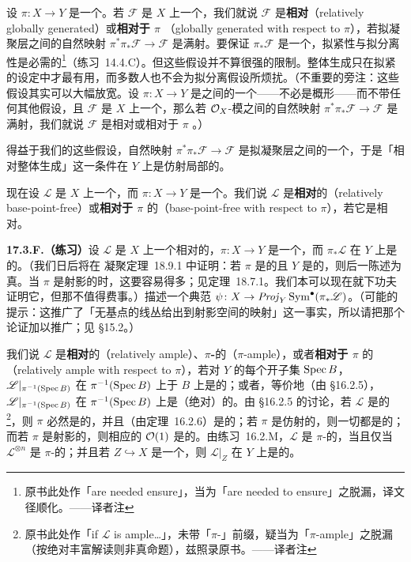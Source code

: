 设 $\pi\colon X\to Y$ 是一个\trQuasicompact\trQuasiSeparated\trMorphism。若 $\mathscr{F}$ 是 $X$ 上一个\trQCSheaf，我们就说 $\mathscr{F}$ 是\textbf{相对\trGloballyGenerated}（relatively globally generated）或\textbf{相对于 $\pi$ \trGloballyGenerated}（globally generated with respect to $\pi$），若拟凝聚层之间的自然映射 $\pi^*\pi_*\mathscr{F}\to\mathscr{F}$ 是满射。要保证 $\pi_*\mathscr{F}$ 是一个\trQCSheaf，拟紧性与拟分离性是必需的\footnote{原书此处作「are needed ensure」，当为「are needed to ensure」之脱漏，译文径顺化。——译者注}（\mbox{练习~14.4.C}）。但这些假设并不算很强的限制。整体生成只在拟紧的设定中才最有用，而多数人也不会为拟分离假设所烦扰。（不重要的旁注：这些假设其实可以大幅放宽。设 $\pi\colon X\to Y$ 是\emph{\trLocallyRingedSpace}之间的一个\trMorphism——不必是概形——而不带任何其他假设，且 $\mathscr{F}$ 是 $X$ 上一个\trQCSheaf，那么若 $\mathcal{O}_X$-模之间的自然映射 $\pi^*\pi_*\mathscr{F}\to\mathscr{F}$ 是满射，我们就说 $\mathscr{F}$ 是相对\trGloballyGenerated{}或相对于 $\pi$ \trGloballyGenerated。）

得益于我们的这些假设，自然映射 $\pi^*\pi_*\mathscr{F}\to\mathscr{F}$ 是拟凝聚层之间的一个\trMorphism，于是「相对整体生成」这一条件在 $Y$ 上是仿射局部的。

现在设 $\mathscr{L}$ 是 $X$ 上一个\trLocallyFreeSheaf，而 $\pi\colon X\to Y$ 是一个\trMorphism。我们说 $\mathscr{L}$ 是\textbf{相对\trBasePointFree}的（relatively base-point-free）或\textbf{相对于 $\pi$ \trBasePointFree}的（base-point-free with respect to $\pi$），若它是相对\trGloballyGenerated。

\textbf{17.3.F.（练习）}\quad 设 $\mathscr{L}$ 是 $X$ 上一个相对\trBasePointFree{}的\trLineBundle，$\pi\colon X\to Y$ 是一个\trQuasicompact\trSeparated\trMorphism，而 $\pi_*\mathscr{L}$ 在 $Y$ 上是\trFiniteType{}的。（我们日后将在 \trGrothendieck{}凝聚定理~18.9.1 中证明：若 $\pi$ 是\trProper{}的且 $Y$ 是\trNoetherian{}的，则后一陈述为真。当 $\pi$ 是射影的时，这要容易得多；见\mbox{定理~18.7.1}。我们本可以现在就下功夫证明它，但那不值得费事。）描述一个典范\trMorphism{} $\psi\colon X\to\mathit{Proj}_Y\operatorname{Sym}^\bullet(\pi_*\mathscr{L})$。（可能的提示：这推广了「无基点的线丛给出到射影空间的映射」这一事实，所以请把那个论证加以推广；见 \S15.2。）

我们说 $\mathscr{L}$ 是\textbf{相对\trAmple}的（relatively ample）、\textbf{$\pi$-\trAmple}的（$\pi$-ample），或者\textbf{相对于 $\pi$ \trAmple}的（relatively ample with respect to $\pi$），若对 $Y$ 的每个\trAffine{}开子集 $\operatorname{Spec} B$，$\mathscr{L}|_{\pi^{-1}(\operatorname{Spec} B)}$ 在 $\pi^{-1}(\operatorname{Spec} B)$ 上于 $B$ 上是\trAmple{}的；或者，等价地（由 \S16.2.5），$\mathscr{L}|_{\pi^{-1}(\operatorname{Spec} B)}$ 在 $\pi^{-1}(\operatorname{Spec} B)$ 上是（绝对）\trAmple{}的。由 \S16.2.5 的讨论，若 $\mathscr{L}$ 是\trAmple{}的\footnote{原书此处作「if $\mathscr{L}$ is ample…」，未带「$\pi$-」前缀，疑当为「$\pi$-ample」之脱漏（按绝对丰富解读则非真命题），兹照录原书。——译者注}，则 $\pi$ 必然是\trQuasicompact{}的，并且（由\mbox{定理~16.2.6}）是\trSeparated{}的；若 $\pi$ 是仿射的，则一切\trInvertibleSheaf{}都是\trAmple{}的；而若 $\pi$ 是射影的，则相应的 $\mathcal{O}(1)$ 是\trAmple{}的。由\mbox{练习~16.2.M}，$\mathscr{L}$ 是 $\pi$-\trAmple{}的，当且仅当 $\mathscr{L}^{\otimes n}$ 是 $\pi$-\trAmple{}的；并且若 $Z\hookrightarrow X$ 是一个\trClosedEmbedding，则 $\mathscr{L}|_Z$ 在 $Y$ 上是\trAmple{}的。

